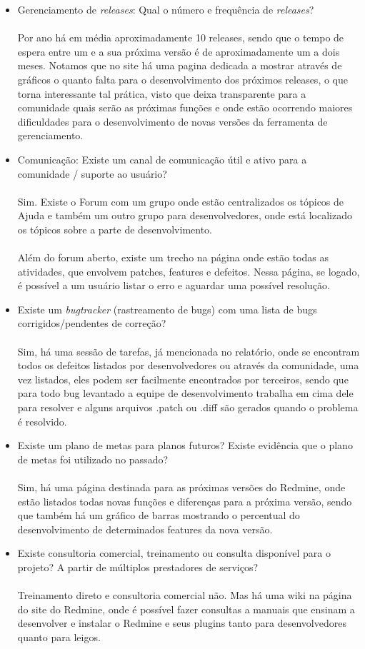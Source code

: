 \documentclass[12pt,a4paper]{article} %
\begin{document}
\begin{itemize}
\item Gerenciamento de \textit{releases}: Qual o n\'umero e frequ\^encia de \textit{releases}?\\
\\ Por ano há em média aproximadamente 10 releases, sendo que o tempo de espera entre um e a sua próxima versão é de aproximadamente um a dois meses. Notamos que no site há uma pagina dedicada a mostrar através de gráficos o quanto falta para o desenvolvimento dos próximos releases, o que torna interessante tal prática, visto que deixa transparente para a comunidade quais serão as próximas funções e onde estão ocorrendo maiores dificuldades para o desenvolvimento de novas versões da ferramenta de gerenciamento.
\item Comunicação: Existe um canal de comunicação \'util e ativo para a comunidade / suporte ao usu\'ario?\\
\\ Sim. Existe o Forum com um grupo onde estão centralizados os tópicos de Ajuda e também um outro grupo para desenvolvedores, onde está localizado os tópicos sobre a parte de desenvolvimento.\\
\\ Além do forum aberto, existe um trecho na página onde estão todas as atividades, que envolvem patches, features e defeitos. Nessa página, se logado, é possível a um usuário listar o erro e aguardar uma possível resolução.
\item Existe um \textit{bugtracker} (rastreamento de bugs) com uma lista de bugs corrigidos/pendentes de correç\~ao?\\
\\ Sim, há uma sessão de tarefas, já mencionada no relatório, onde se encontram todos os defeitos listados por desenvolvedores ou através da comunidade, uma vez listados, eles podem ser facilmente encontrados por terceiros, sendo que para todo bug levantado a equipe de desenvolvimento trabalha em cima dele para resolver e alguns arquivos .patch ou .diff são gerados quando o problema é resolvido.
\item Existe um plano de metas para planos futuros? Existe evid\^encia que o plano de metas foi utilizado no passado?\\
\\ Sim, há uma página destinada para as próximas versões do Redmine, onde estão listados todas novas funções e diferenças para a próxima versão, sendo que também há um gráfico de barras mostrando o percentual do desenvolvimento de determinados features da nova versão.
\item Existe consultoria comercial, treinamento ou consulta dispon\'ivel para o projeto? A partir de m\'ultiplos prestadores de serviços?\\
\\ Treinamento direto e consultoria comercial não. Mas há uma wiki na página do site do Redmine, onde é possível fazer consultas a manuais que ensinam a desenvolver e instalar o Redmine e seus plugins tanto para desenvolvedores quanto para leigos. 
\end{itemize}
        

\par\vspace{\baselineskip}

\end{document}
